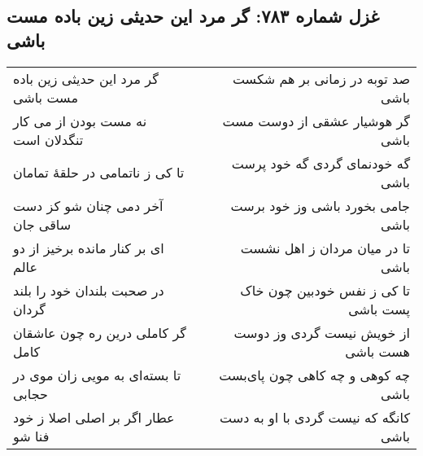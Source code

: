 \begin{center}
\section*{غزل شماره ۷۸۳: گر مرد این حدیثی زین باده مست باشی}
\label{sec:783}
\begin{longtable}{l p{0.5cm} r}
گر مرد این حدیثی زین باده مست باشی
&&
صد توبه در زمانی بر هم شکست باشی
\\
نه مست بودن از می کار تنگدلان است
&&
گر هوشیار عشقی از دوست مست باشی
\\
تا کی ز ناتمامی در حلقهٔ تمامان
&&
گه خودنمای گردی گه خود پرست باشی
\\
آخر دمی چنان شو کز دست ساقی جان
&&
جامی بخورد باشی وز خود برست باشی
\\
ای بر کنار مانده برخیز از دو عالم
&&
تا در میان مردان ز اهل نشست باشی
\\
در صحبت بلندان خود را بلند گردان
&&
تا کی ز نفس خودبین چون خاک پست باشی
\\
گر کاملی درین ره چون عاشقان کامل
&&
از خویش نیست گردی وز دوست هست باشی
\\
تا بسته‌ای به مویی زان موی در حجابی
&&
چه کوهی و چه کاهی چون پای‌بست باشی
\\
عطار اگر بر اصلی اصلا ز خود فنا شو
&&
کانگه که نیست گردی با او به دست باشی
\\
\end{longtable}
\end{center}

